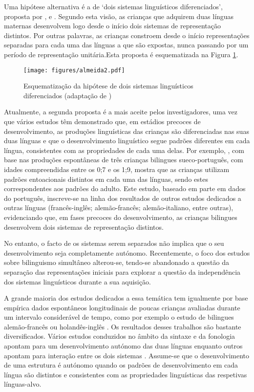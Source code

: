 \documentclass[output=paper]{LSP/langsci}
\begin{document}
Uma hipótese alternativa é a de ‘dois sistemas linguísticos diferenciados’, proposta por \citet{genesee1989}, \cite{leisel1989} e \cite{dehouwer1990}. Segundo esta visão, as crianças que adquirem duas línguas maternas desenvolvem logo desde o início dois sistemas de representação distintos. Por outras palavras, as crianças constroem desde o início representações separadas para cada uma das línguas a que são expostas, nunca passando por um período de representação unitária.\largerpage Esta proposta é esquematizada na Figura \ref{fig:almeida_2}.

\begin{figure}[t]
\texttt{[image: figures/almeida2.pdf]}
\caption{Esquematização da hipótese de dois sistemas linguísticos diferenciados (adaptação de \citealt{genesee_etal2004})}
\label{fig:almeida_2}
\end{figure}

Atualmente, a segunda proposta é a mais aceite pelos investigadores, uma vez que vários estudos têm demonstrado que, em estádios precoces de desenvolvimento, as produções linguísticas das crianças são diferenciadas nas suas duas línguas e que o desenvolvimento linguístico segue padrões diferentes em cada língua, consistentes com as propriedades de cada uma delas. Por exemplo, \cite{cruz-ferreira2003}, com base nas produções espontâneas de três crianças bilingues sueco-português, com idades compreendidas entre os 0;7 e os 1;9, mostra que as crianças utilizam padrões entoacionais distintos em cada uma das línguas, sendo estes correspondentes aos padrões do adulto. Este estudo, baseado em parte em dados do português, inscreve-se na linha dos resultados de outros estudos dedicados a outras línguas (francês-inglês; alemão-francês; alemão-italiano, entre outras), evidenciando que, em fases precoces do desenvolvimento, as crianças bilingues desenvolvem dois sistemas de representação distintos.

No entanto, o facto de os sistemas serem separados não implica que o seu desenvolvimento seja completamente autónomo. Recentemente, o foco dos estudos sobre bilinguismo simultâneo alterou-se, tendo-se abandonado a questão da separação das representações iniciais para explorar a questão da independência dos sistemas linguísticos durante a sua aquisição. 

A grande maioria dos estudos dedicados a essa temática tem igualmente por base empírica dados espontâneos longitudinais de poucas crianças avaliadas durante um intervalo considerável de tempo, como por exemplo o estudo de bilingues alemão-francês \citep{leisel1989} ou holandês-inglês \citep{dehouwer1990}. Os resultados desses trabalhos são bastante diversificados. Vários estudos conduzidos no âmbito da sintaxe e da fonologia apontam para um desenvolvimento autónomo das duas línguas enquanto outros apontam para interação entre os dois sistemas \citep{genesee_etal2004,meisel2004}. Assume-se que o desenvolvimento de uma estrutura é autónomo quando os padrões de desenvolvimento em cada língua são distintos e consistentes com as propriedades linguísticas das respetivas línguas-alvo. 
\end{document}
